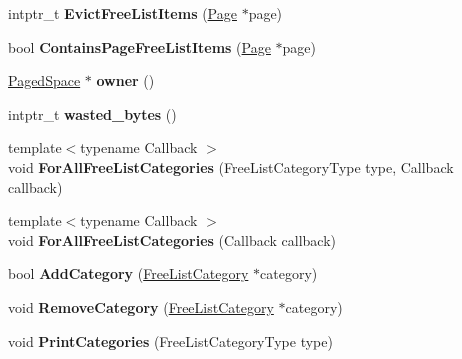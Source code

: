 \begin{DoxyCompactItemize}
\item 
intptr\+\_\+t {\bfseries Evict\+Free\+List\+Items} (\hyperlink{classv8_1_1internal_1_1_page}{Page} $\ast$page)\hypertarget{classv8_1_1internal_1_1_free_list_af4bc24f92064535386c65fac4ef7002a}{}\label{classv8_1_1internal_1_1_free_list_af4bc24f92064535386c65fac4ef7002a}

\item 
bool {\bfseries Contains\+Page\+Free\+List\+Items} (\hyperlink{classv8_1_1internal_1_1_page}{Page} $\ast$page)\hypertarget{classv8_1_1internal_1_1_free_list_a79583a8994240cfcbe9b62633fd974c6}{}\label{classv8_1_1internal_1_1_free_list_a79583a8994240cfcbe9b62633fd974c6}

\item 
\hyperlink{classv8_1_1internal_1_1_paged_space}{Paged\+Space} $\ast$ {\bfseries owner} ()\hypertarget{classv8_1_1internal_1_1_free_list_aba609378dacfc7db328fb7f59a5e0ac7}{}\label{classv8_1_1internal_1_1_free_list_aba609378dacfc7db328fb7f59a5e0ac7}

\item 
intptr\+\_\+t {\bfseries wasted\+\_\+bytes} ()\hypertarget{classv8_1_1internal_1_1_free_list_af51ea2dc94b388739976d6fd737fec9c}{}\label{classv8_1_1internal_1_1_free_list_af51ea2dc94b388739976d6fd737fec9c}

\item 
{\footnotesize template$<$typename Callback $>$ }\\void {\bfseries For\+All\+Free\+List\+Categories} (Free\+List\+Category\+Type type, Callback callback)\hypertarget{classv8_1_1internal_1_1_free_list_a874575254a8775cea516360ac77fa79f}{}\label{classv8_1_1internal_1_1_free_list_a874575254a8775cea516360ac77fa79f}

\item 
{\footnotesize template$<$typename Callback $>$ }\\void {\bfseries For\+All\+Free\+List\+Categories} (Callback callback)\hypertarget{classv8_1_1internal_1_1_free_list_a3f8c32e83ac1e62650e96615d3a85e49}{}\label{classv8_1_1internal_1_1_free_list_a3f8c32e83ac1e62650e96615d3a85e49}

\item 
bool {\bfseries Add\+Category} (\hyperlink{classv8_1_1internal_1_1_free_list_category}{Free\+List\+Category} $\ast$category)\hypertarget{classv8_1_1internal_1_1_free_list_a5e449f34c8035d4f353c10cb8bfc6272}{}\label{classv8_1_1internal_1_1_free_list_a5e449f34c8035d4f353c10cb8bfc6272}

\item 
void {\bfseries Remove\+Category} (\hyperlink{classv8_1_1internal_1_1_free_list_category}{Free\+List\+Category} $\ast$category)\hypertarget{classv8_1_1internal_1_1_free_list_ae9eb2b754f476bc5b138d7b5e9407550}{}\label{classv8_1_1internal_1_1_free_list_ae9eb2b754f476bc5b138d7b5e9407550}

\item 
void {\bfseries Print\+Categories} (Free\+List\+Category\+Type type)\hypertarget{classv8_1_1internal_1_1_free_list_af3cbe43b30d422110caba0e7f86bf673}{}\label{classv8_1_1internal_1_1_free_list_af3cbe43b30d422110caba0e7f86bf673}

\end{DoxyCompactItemize}
